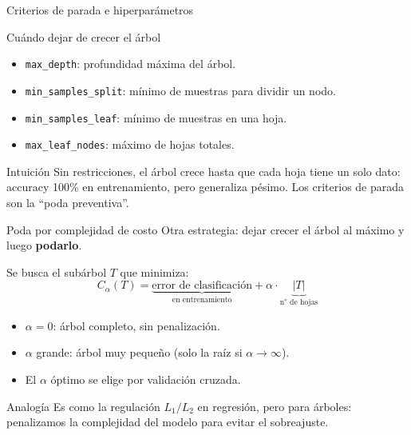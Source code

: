 \documentclass[aspectratio=169]{beamer}
\begin{document}
\begin{frame}{Criterios de parada e hiperparámetros}
  \begin{block}{Cuándo dejar de crecer el árbol}
    \begin{itemize}
      \item \texttt{max\_depth}: profundidad máxima del árbol.
      \item \texttt{min\_samples\_split}: mínimo de muestras para dividir un nodo.
      \item \texttt{min\_samples\_leaf}: mínimo de muestras en una hoja.
      \item \texttt{max\_leaf\_nodes}: máximo de hojas totales.
    \end{itemize}
  \end{block}

  \medskip
  \begin{exampleblock}{Intuición}
    Sin restricciones, el árbol crece hasta que cada hoja tiene un solo dato:
    accuracy 100\% en entrenamiento, pero generaliza pésimo.
    Los criterios de parada son la ``poda preventiva''.
  \end{exampleblock}
\end{frame}

\begin{frame}{Poda por complejidad de costo}
  Otra estrategia: dejar crecer el árbol al máximo y luego \textbf{podarlo}.

  \medskip
  Se busca el subárbol $T$ que minimiza:
  \[
    C_\alpha(T) = \underbrace{\text{error de clasificación}}_{\text{en entrenamiento}} + \alpha \cdot \underbrace{|T|}_{\text{n° de hojas}}
  \]

  \begin{itemize}
    \item $\alpha = 0$: árbol completo, sin penalización.
    \item $\alpha$ grande: árbol muy pequeño (solo la raíz si $\alpha \to \infty$).
    \item El $\alpha$ óptimo se elige por validación cruzada.
  \end{itemize}

  \medskip
  \begin{exampleblock}{Analogía}
    Es como la regulación $L_1/L_2$ en regresión, pero para árboles:
    penalizamos la complejidad del modelo para evitar el sobreajuste.
  \end{exampleblock}
\end{frame}
\end{document}
